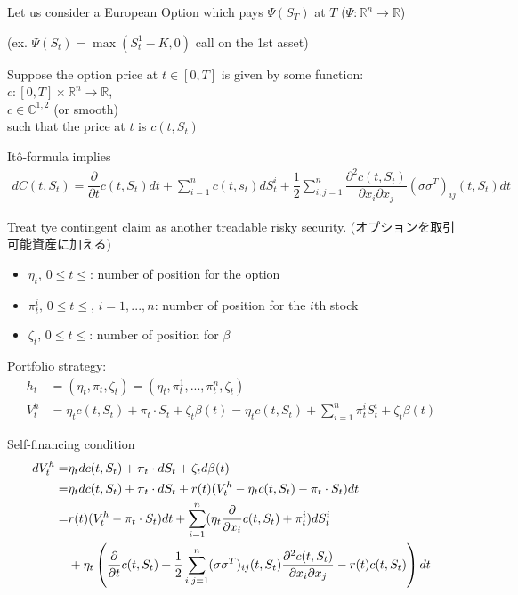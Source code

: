 \documentclass[a4paper,11pt]{jsarticle}
\theoremstyle{definition}
\newcommand{\pd}[2]{\dfrac{\partial #1}{\partial #2}}
\newcommand{\df}[2]{\dfrac{#1}{#2}}
\begin{document}
Let us consider a European Option which pays
$\Psi(S_T)$ at $T$ ($\Psi:\mathbb{R}^n \to \mathbb{R}$)

(ex. $\Psi(S_t)=\max(S_t^1-K,0)$ call on the 1st asset)

Suppose the option price at $t\in[0,T]$
is given by some function: \\
$c:[0,T]\times \mathbb{R}^n\to\mathbb{R}$, \\
$c\in \mathbb{C}^{1,2}$ (or smooth) \\
such that the price at $t$ is $c(t,S_t)$

It\^{o}-formula implies
\begin{align}
  dC(t,S_t)=\pd{}{t}c(t,S_t)dt+\sum_{i=1}^n c(t,s_t)dS_t^i
  +\df{1}{2}\sum_{i,j=1}^n
  \df{\partial^2 c(t,S_t)}{\partial x_i \partial x_j}
  (\sigma \sigma^T)_{ij}(t,S_t)dt
\end{align}


Treat tye contingent claim as another treadable risky security.
(オプションを取引可能資産に加える)
\begin{itemize}
  \item $\eta_t, \, 0\leq t\leq$:
  number of position for the option
  \item $\pi_t^i, \, 0\leq t\leq, \, i=1,...,n$:
  number of position for the $i$th stock
  \item $\zeta_t, \, 0\leq t\leq$:
  number of position for $\beta$
\end{itemize}

Portfolio strategy:
\begin{align}
  h_t&=(\eta_t,\pi_t,\zeta_t)=(\eta_t,\pi_t^1,...,\pi_t^n,\zeta_t)\\
  V_t^h&=\eta_t c(t,S_t)+\pi_t\cdot S_t+\zeta_t \beta(t)
  =\eta_t c(t,S_t)+\sum_{i=1}^n \pi_t^i S_t^i+\zeta_t \beta(t)
\end{align}

Self-financing condition
\begin{align}
  dV_t^h=&\eta_t dc(t,S_t)+ \pi_t\cdot dS_t+\zeta_t d\beta(t) \notag\\
  =&\eta_t dc(t,S_t)+ \pi_t\cdot dS_t
  +r(t)(V_t^h-\eta_t c(t,S_t)-\pi_t\cdot S_t)dt \\
  =&r(t)(V_t^h-\pi_t\cdot S_t)dt
  +\sum_{i=1}^n(\eta_t \pd{}{x_i}c(t,S_t)+\pi_t^i)dS_t^i \notag\\ 
  &+\eta_t\left(\pd{}{t}c(t,S_t)+\df{1}{2}\sum_{i,j=1}^n
  (\sigma \sigma^T)_{ij}(t,S_t)
  \df{\partial^2 c(t,S_t)}{\partial x_i \partial x_j}
  -r(t)c(t,S_t)\right)dt
\end{align}
\end{document}
